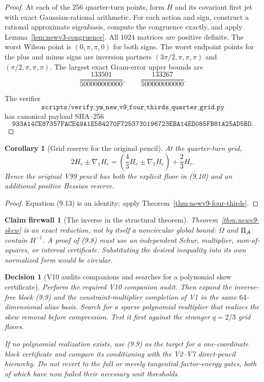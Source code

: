 \documentclass[11pt,oneside]{article}
\newtheorem{corollary}[theorem]{Corollary}
\newtheorem{firewall}[theorem]{Claim firewall}
\newtheorem{decision}[theorem]{Decision}
\theoremstyle{definition}
\theoremstyle{remark}
\begin{document}
\begin{proof}
At each of the \(256\) quarter-turn points, form \(H\) and its
covariant first jet with exact Gaussian-rational arithmetic.  For
each action and sign, construct a rational approximate eigenbasis,
compute the congruence exactly, and apply
Lemma~\ref{lem:newv3-congruence}.  All \(1024\) matrices are
positive definite.  The worst Wilson point is
\((0,\pi,\pi,0)\) for both signs.  The worst endpoint points for the
plus and minus signs are inversion partners
\((3\pi/2,\pi,\pi,\pi)\) and \((\pi/2,\pi,\pi,\pi)\).
The largest exact Gram-error upper bounds are
\[
 \frac{133501}{500000000000},\qquad
 \frac{133267}{500000000000}.                             \tag{9.11}
\]

The verifier
\[
\texttt{scripts/verify\_ym\_new\_v9\_four\_thirds\_quarter\_grid.py}
\]
has canonical payload SHA--256
\[
\texttt{933A14CE87357FACE49A1E584270F7253730196723EBA14ED085FB81A25AD5BD}.
                                                               \tag{9.12}
\]
\end{proof}

\begin{corollary}[Grid reserve for the original pencil]
\label{cor:newv9-reserve}
At the quarter-turn grid,
\[
 2H_e\pm\nabla_1H_e
 =
 \left(\frac43H_e\pm\nabla_1H_e\right)+\frac23H_e.        \tag{9.13}
\]
Hence the original V99 pencil has both the explicit floor in
(9.10) and an additional positive Hessian reserve.
\end{corollary}

\begin{proof}
Equation (9.13) is an identity; apply
Theorem~\ref{thm:newv9-four-thirds}.
\end{proof}

\begin{firewall}[The inverse in the structural theorem]
\label{fire:newv9-inverse}
Theorem~\ref{thm:newv9-skew} is an exact reduction, not by itself a
noncircular global bound: \(\Omega\) and \(\Pi_{\cal A}\) contain
\(H^{-1}\).  A proof of (9.8) must use an independent Schur,
multiplier, sum-of-squares, or interval certificate.  Substituting
the desired inequality into its own normalized form would be
circular.
\end{firewall}

\begin{decision}[V10 audits companions and searches for a polynomial skew certificate]
\label{dec:newv9-next}
Perform the required V10 companion audit.  Then expand the
inverse-free block (9.9) and the constraint-multiplier completion of
V1 in the same \(64\)-dimensional alias basis.  Search for a sparse
polynomial multiplier that realizes the skew removal before
compression.  Test it first against the stronger \(q=2/3\) grid
floors.

If no polynomial realization exists, use (9.9) as the target for a
one-coordinate block certificate and compare its conditioning with
the V2--V7 direct-pencil hierarchy.  Do not revert to the full or
merely tangential factor-energy gates, both of which have now failed
their necessary unit thresholds.
\end{decision}
\end{document}
